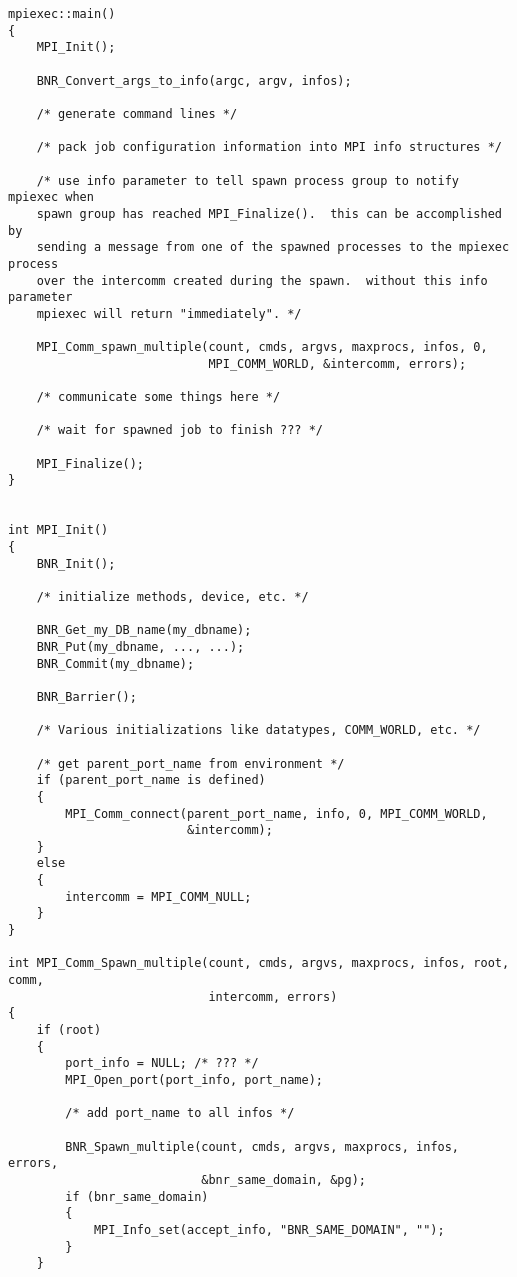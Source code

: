 \documentclass{article}
\begin{document}
\begin{verbatim}
mpiexec::main()
{
    MPI_Init();

    BNR_Convert_args_to_info(argc, argv, infos);
    
    /* generate command lines */

    /* pack job configuration information into MPI info structures */

    /* use info parameter to tell spawn process group to notify mpiexec when
    spawn group has reached MPI_Finalize().  this can be accomplished by
    sending a message from one of the spawned processes to the mpiexec process
    over the intercomm created during the spawn.  without this info parameter
    mpiexec will return "immediately". */
    
    MPI_Comm_spawn_multiple(count, cmds, argvs, maxprocs, infos, 0,
                            MPI_COMM_WORLD, &intercomm, errors);

    /* communicate some things here */

    /* wait for spawned job to finish ??? */

    MPI_Finalize();
}


int MPI_Init()
{
    BNR_Init();

    /* initialize methods, device, etc. */
    
    BNR_Get_my_DB_name(my_dbname);
    BNR_Put(my_dbname, ..., ...);
    BNR_Commit(my_dbname);

    BNR_Barrier();
    
    /* Various initializations like datatypes, COMM_WORLD, etc. */

    /* get parent_port_name from environment */
    if (parent_port_name is defined)
    {
        MPI_Comm_connect(parent_port_name, info, 0, MPI_COMM_WORLD,
                         &intercomm);
    }
    else
    {
        intercomm = MPI_COMM_NULL;
    }
}

int MPI_Comm_Spawn_multiple(count, cmds, argvs, maxprocs, infos, root, comm,
                            intercomm, errors)
{
    if (root)
    {
        port_info = NULL; /* ??? */
        MPI_Open_port(port_info, port_name);

        /* add port_name to all infos */

        BNR_Spawn_multiple(count, cmds, argvs, maxprocs, infos, errors,
                           &bnr_same_domain, &pg);
        if (bnr_same_domain)
        {
            MPI_Info_set(accept_info, "BNR_SAME_DOMAIN", "");
        }
    }


\end{verbatim}
\end{document}
